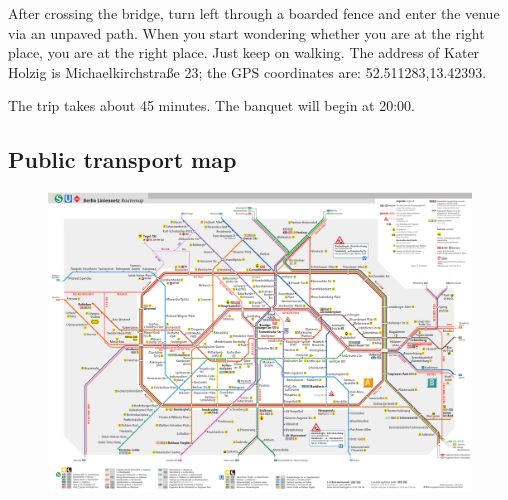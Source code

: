After crossing the bridge, turn left through a boarded fence and enter the venue via an unpaved path. When you start wondering whether you are at the right place, you are at the right place.  Just keep on walking.  The address of Kater Holzig is Michaelkirchstra{\ss}e 23; the GPS coordinates are: 52.511283,13.42393. 

The trip takes about 45 minutes. The banquet will begin at 20:00.


\begin{landscape}
 \section{Public transport map}
\begin{figure}[h!]
\includegraphics[height=0.9\textwidth, keepaspectratio]{local_img/maps/bvg}
\end{figure}
\end{landscape}


\setlength\fboxrule{0pt}

